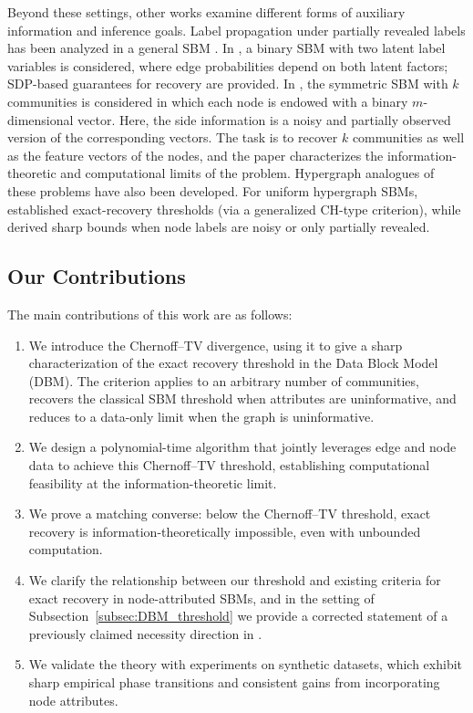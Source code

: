 \documentclass[11pt]{article}
\theoremstyle{plain}
\theoremstyle{definition}
\begin{document}
Beyond these settings, other works examine different forms of auxiliary information and inference goals. Label propagation under partially revealed labels has been analyzed in a general SBM \citep{SSDGMP20}. In \citet{EN20a}, a binary SBM with two latent label variables is considered, where edge probabilities depend on both latent factors; SDP-based guarantees for recovery are provided. In \citet{YLS18}, the symmetric SBM with $k$ communities is considered in which each node is endowed with a binary $m$-dimensional vector. Here, the side information is a noisy and partially observed version of the corresponding vectors. The task is to recover $k$ communities as well as the feature vectors of the nodes, and the paper characterizes the information-theoretic and computational limits of the problem. Hypergraph analogues of these problems have also been developed. For uniform hypergraph SBMs, \citet{ZT21} established exact-recovery thresholds (via a generalized CH-type criterion), while \citet{ZZY21} derived sharp bounds when node labels are noisy or only partially revealed.
 




\subsection{Our Contributions}
The main contributions of this work are as follows:

\begin{enumerate}
    \item We introduce the Chernoff--TV divergence, using it to give a sharp characterization of the exact recovery threshold in the Data Block Model (DBM). The criterion applies to an arbitrary number of communities, recovers the classical SBM threshold when attributes are uninformative, and reduces to a data-only limit when the graph is uninformative.
    \item We design a polynomial-time algorithm that jointly leverages edge and node data to achieve this Chernoff--TV threshold, establishing computational feasibility at the information-theoretic limit.
    \item We prove a matching converse: below the Chernoff--TV threshold, exact recovery is information-theoretically impossible, even with unbounded computation.
    \item We clarify the relationship between our threshold and existing criteria for exact recovery in node-attributed SBMs, and in the setting of Subsection~\ref{subsec:DBM_threshold} we provide a corrected statement of a previously claimed necessity direction in \citep{dreveton2023exactAttributedSBM}.
    \item We validate the theory with experiments on synthetic datasets, which exhibit sharp empirical phase transitions and consistent gains from incorporating node attributes.
\end{enumerate}
\end{document}
